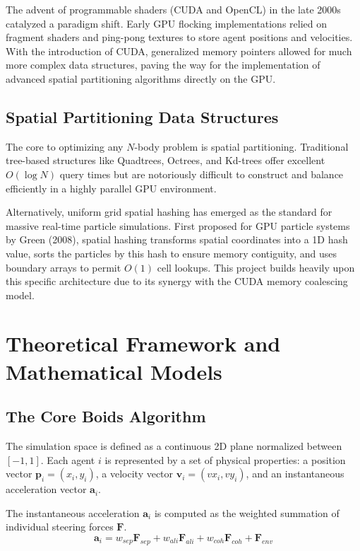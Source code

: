 \documentclass[12pt,a4paper]{report}
\begin{document}
The advent of programmable shaders (CUDA and OpenCL) in the late 2000s catalyzed a paradigm shift. Early GPU flocking implementations relied on fragment shaders and ping-pong textures to store agent positions and velocities. With the introduction of CUDA, generalized memory pointers allowed for much more complex data structures, paving the way for the implementation of advanced spatial partitioning algorithms directly on the GPU.

\section{Spatial Partitioning Data Structures}
The core to optimizing any $N$-body problem is spatial partitioning. Traditional tree-based structures like Quadtrees, Octrees, and Kd-trees offer excellent $O(\log N)$ query times but are notoriously difficult to construct and balance efficiently in a highly parallel GPU environment. 

Alternatively, uniform grid spatial hashing has emerged as the standard for massive real-time particle simulations. First proposed for GPU particle systems by Green (2008), spatial hashing transforms spatial coordinates into a 1D hash value, sorts the particles by this hash to ensure memory contiguity, and uses boundary arrays to permit $O(1)$ cell lookups. This project builds heavily upon this specific architecture due to its synergy with the CUDA memory coalescing model.

\chapter{Theoretical Framework and Mathematical Models}

\section{The Core Boids Algorithm}
The simulation space is defined as a continuous 2D plane normalized between $[-1, 1]$. Each agent $i$ is represented by a set of physical properties: a position vector $\mathbf{p}_i = (x_i, y_i)$, a velocity vector $\mathbf{v}_i = (vx_i, vy_i)$, and an instantaneous acceleration vector $\mathbf{a}_i$. 

The instantaneous acceleration $\mathbf{a}_i$ is computed as the weighted summation of individual steering forces $\mathbf{F}$.
\begin{equation}
\mathbf{a}_i = w_{sep}\mathbf{F}_{sep} + w_{ali}\mathbf{F}_{ali} + w_{coh}\mathbf{F}_{coh} + \mathbf{F}_{env}
\end{equation}
\end{document}
